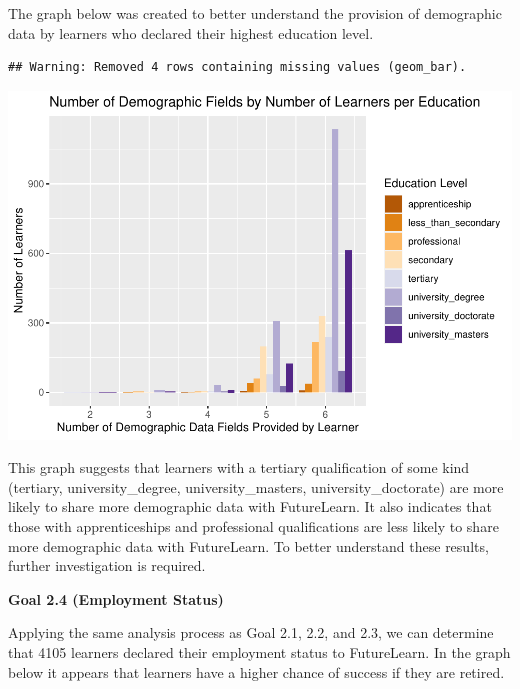\documentclass[
]{article}
\begin{document}
The graph below was created to better understand the provision of
demographic data by learners who declared their highest education level.

\begin{verbatim}
## Warning: Removed 4 rows containing missing values (geom_bar).
\end{verbatim}

\includegraphics{CSC8631-Report---210431461_files/figure-latex/education_demographics_declared-1.pdf}

This graph suggests that learners with a tertiary qualification of some
kind (tertiary, university\_degree, university\_masters,
university\_doctorate) are more likely to share more demographic data
with FutureLearn. It also indicates that those with apprenticeships and
professional qualifications are less likely to share more demographic
data with FutureLearn. To better understand these results, further
investigation is required.

\textbf{Goal 2.4 (Employment Status)}

Applying the same analysis process as Goal 2.1, 2.2, and 2.3, we can
determine that 4105 learners declared their employment status to
FutureLearn. In the graph below it appears that learners have a higher
chance of success if they are retired.
\end{document}
